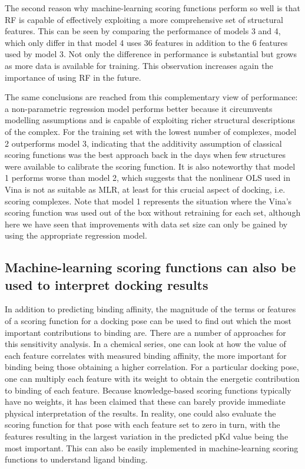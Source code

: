 The second reason why machine-learning scoring functions perform so well is that RF is capable of effectively exploiting a more comprehensive set of structural features. This can be seen by comparing the performance of models 3 and 4, which only differ in that model 4 uses 36 features in addition to the 6 features used by model 3. Not only the difference in performance is substantial but grows as more data is available for training. This observation increases again the importance of using RF in the future.

The same conclusions are reached from this complementary view of performance: a non-parametric regression model performs better because it circumvents modelling assumptions and is capable of exploiting richer structural descriptions of the complex. For the training set with the lowest number of complexes, model 2 outperforms model 3, indicating that the additivity assumption of classical scoring functions was the best approach back in the days when few structures were available to calibrate the scoring function. It is also noteworthy that model 1 performs worse than model 2, which suggests that the nonlinear OLS used in Vina is not as suitable as MLR, at least for this crucial aspect of docking, i.e. scoring complexes. Note that model 1 represents the situation where the Vina's scoring function was used out of the box without retraining for each set, although here we have seen that improvements with data set size can only be gained by using the appropriate regression model.

\subsection{Machine-learning scoring functions can also be used to interpret docking results}

In addition to predicting binding affinity, the magnitude of the terms or features of a scoring function for a docking pose can be used to find out which the most important contributions to binding are. There are a number of approaches for this sensitivity analysis. In a chemical series, one can look at how the value of each feature correlates with measured binding affinity, the more important for binding being those obtaining a higher correlation. For a particular docking pose, one can multiply each feature with its weight to obtain the energetic contribution to binding of each feature. Because knowledge-based scoring functions typically have no weights, it has been claimed \citep{1372} that these can barely provide immediate physical interpretation of the results. In reality, one could also evaluate the scoring function for that pose with each feature set to zero in turn, with the features resulting in the largest variation in the predicted pKd value being the most important. This can also be easily implemented in machine-learning scoring functions to understand ligand binding.

